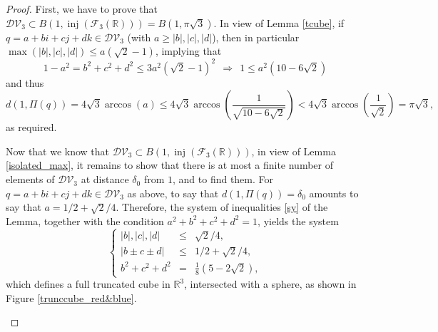 \documentclass[11pt,twoside]{amsart}
\theoremstyle{plain}
\newcommand{\R}{{\mathbb R}}
\DeclareMathOperator\inj{inj}
\begin{document}
\begin{proof}
First, we have to prove that $\mathcal{DV}_3\subset B(1,\inj(\mathcal{F}_3(\R)))=B(1,\pi\sqrt{3})$. In view of Lemma \ref{tcube}, if $q=a+bi+cj+dk\in\mathcal{DV}_3$ (with $a\ge |b|,|c|,|d|$), then in particular $\max(|b|,|c|,|d|)\le a(\sqrt{2}-1)$, implying that
\[1-a^2=b^2+c^2+d^2\le 3a^2(\sqrt{2}-1)^2~~\Longrightarrow~~1\le a^2(10-6\sqrt{2})\]
and thus
\[d(1,\Pi({q}))=4\sqrt{3}\arccos(a)\le 4\sqrt{3}\arccos\left(\frac{1}{\sqrt{10-6\sqrt{2}}}\right)<4\sqrt{3}\arccos\left(\frac{1}{\sqrt{2}}\right)=\pi\sqrt{3},\]
as required.

Now that we know that $\mathcal{DV}_3\subset B(1,\inj(\mathcal{F}_3(\R)))$, in view of Lemma \ref{isolated_max}, it remains to show that there is at most a finite number of elements of $\mathcal{DV}_3$ at distance $\delta_0$ from $1$, and to find them. For $q=a+bi+cj+dk\in\mathcal{DV}_3$ as above, to say that $d(1,\Pi(q))=\delta_0$ amounts to say that $a=1/2+\sqrt{2}/4$. Therefore, the system of inequalities \eqref{sy} of the Lemma, together with the condition $a^2+b^2+c^2+d^2=1$, yields the system
\[\left\{\begin{array}{rcl}
|b|,|c|,|d| & \le & \sqrt{2}/4, \\[.5em]
|b\pm c\pm d| & \le & 1/2+\sqrt{2}/4, \\[.5em]
b^2+c^2+d^2 & = & \tfrac{1}{8}(5-2\sqrt{2}),\end{array}\right.\]
which defines a full truncated cube in $\R^3$, intersected with a sphere, as shown in Figure \ref{trunccube_red&blue}. 

\begin{center}
\begin{figure}[h!]
\end{figure}
\end{center}
\end{proof}
\end{document}
